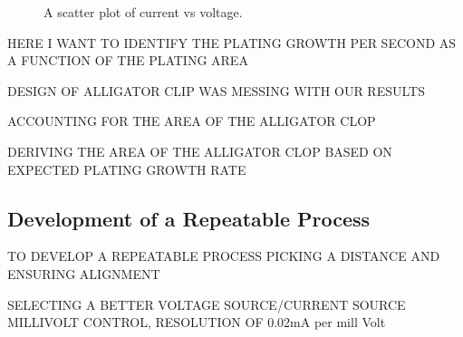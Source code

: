 \begin{figure}
    \centering
    \caption{A scatter plot of current vs voltage.}
    \label{fig:scatterplot}
\end{figure}


HERE I WANT TO IDENTIFY THE PLATING GROWTH PER SECOND AS A FUNCTION OF THE PLATING AREA

DESIGN OF ALLIGATOR CLIP WAS MESSING WITH OUR RESULTS

ACCOUNTING FOR THE AREA OF THE ALLIGATOR CLOP

DERIVING THE AREA OF THE ALLIGATOR CLOP BASED ON EXPECTED PLATING GROWTH RATE



\subsection{Development of a Repeatable Process}

TO DEVELOP A REPEATABLE PROCESS PICKING A DISTANCE AND ENSURING ALIGNMENT

SELECTING A BETTER VOLTAGE SOURCE/CURRENT SOURCE MILLIVOLT CONTROL, RESOLUTION OF 0.02mA per mill Volt


